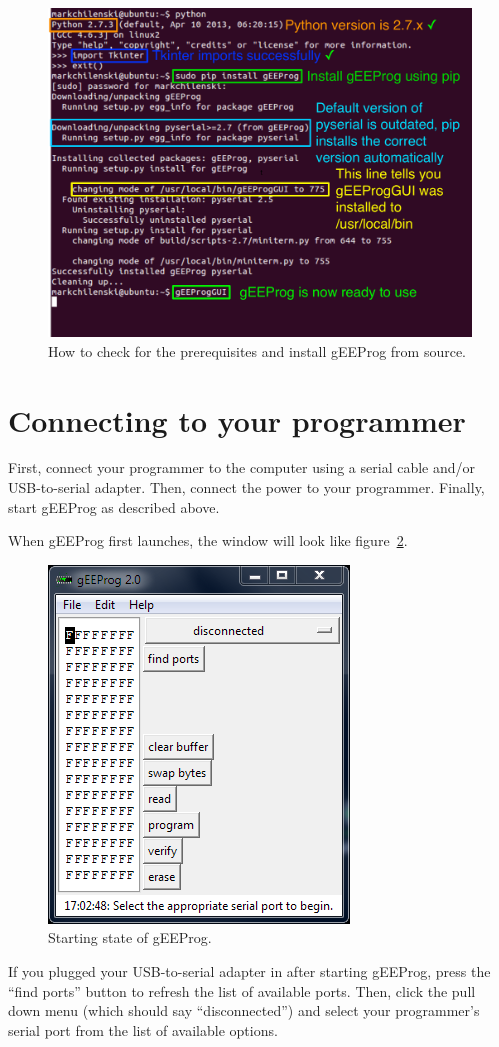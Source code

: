 \documentclass[letter]{article}
\begin{document}
\begin{figure}[bh]
	\centering
	\includegraphics[width=\textwidth]{./graphics/LinuxTutorial}
	\caption{How to check for the prerequisites and install gEEProg from source.}
	\label{fig:install}
\end{figure}

\pagebreak

\section{Connecting to your programmer}
First, connect your programmer to the computer using a serial cable and/or USB-to-serial adapter.
Then, connect the power to your programmer.
Finally, start gEEProg as described above.

When gEEProg first launches, the window will look like figure~\ref{fig:start}.
\begin{figure}
	\centering
	\includegraphics[scale=0.7]{./graphics/start}
	\caption{Starting state of gEEProg.}
	\label{fig:start}
\end{figure}
If you plugged your USB-to-serial adapter in after starting gEEProg, press the ``find ports'' button to refresh the list of available ports.
Then, click the pull down menu (which should say ``disconnected'') and select your programmer's serial port from the list of available options.
\end{document}
